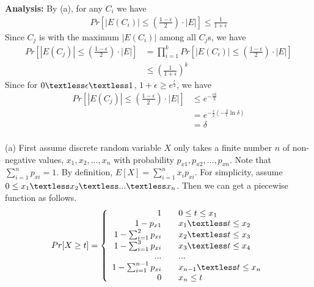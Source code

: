 \textbf{Analysis:}
By (a), for any $C_i$ we have
\begin{align}
    \nonumber Pr[|E(C_i)|\le (\frac{1-\epsilon}{2})\cdot |E|]\le \frac{1}{1+\epsilon}
\end{align}
Since $C_j$ is with the maximum $|E(C_i)|$ among all $C_j$s, we have
\begin{align}
    \nonumber Pr[|E(C_j)|\le (\frac{1-\epsilon}{2})\cdot |E|]&=\prod_{i=1}^k Pr[|E(C_i)|\le (\frac{1-\epsilon}{2})\cdot |E|]\\
    \nonumber &\le (\frac{1}{1+\epsilon})^k
\end{align}
Since for $0\textless \epsilon \textless 1$, $1+\epsilon \ge e^{\frac{\epsilon}{2}}$, we have
\begin{align}
    \nonumber Pr[|E(C_j)|\le (\frac{1-\epsilon}{2})\cdot |E|]&\le e^{-\frac{\epsilon k}{2}}\\
    \nonumber&=e^{-\frac{\epsilon}{2}(-\frac{2}{\epsilon}\ln \delta)}\\
    \nonumber&=\delta
\end{align}
\\
(a) 
First assume discrete random variable $X$ only takes a finite number $n$ of non-negative values, $x_1, x_2,...,x_n$ with probability $p_{x1},p_{x2},...,p_{xn}$. Note that $\sum_{i=1}^{n}p_{xi}=1$. 
By definition, $E[X]=\sum_{i=1}^{n}x_ip_{xi}$.
For simplicity, assume $0\le x_1\textless x_2 \textless ... \textless x_n$.
Then we can get a piecewise function as follows.
\begin{equation}
\nonumber Pr[X\ge t]=\left\{
\begin{array}{rcl}
1 & & {0\le t \le x_1}\\
1-p_{x1} & & {x_1 \textless t \le x_2}\\
1-\sum_{i=1}^{2}p_{xi} & & {x_2 \textless t \le x_3}\\
1-\sum_{i=1}^{3}p_{xi} & & {x_3 \textless t \le x_4}\\
... & & ...\\
1-\sum_{i=1}^{n-1}p_{xi} & & {x_{n-1} \textless t \le x_n}\\
0 & & {x_n \le t}
\end{array} \right.
\end{equation}
